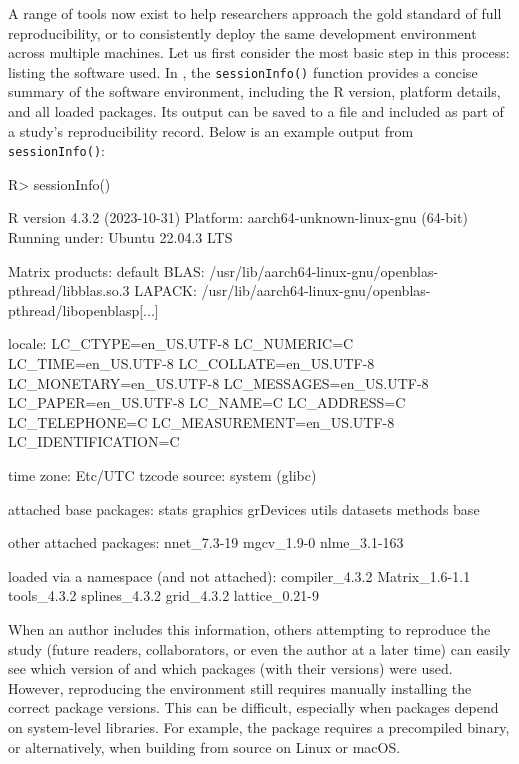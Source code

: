 \documentclass[
  article]{jss}
\begin{document}
A range of tools now exist to help researchers approach the gold
standard of full reproducibility, or to consistently deploy the same
development environment across multiple machines. Let us first consider
the most basic step in this process: listing the software used. In
, the \texttt{sessionInfo()} function provides a concise
summary of the software environment, including the R version, platform
details, and all loaded packages. Its output can be saved to a file and
included as part of a study's reproducibility record. Below is an
example output from \texttt{sessionInfo()}:

\begin{CodeInput}
R> sessionInfo()
\end{CodeInput}
\begin{CodeOutput}
R version 4.3.2 (2023-10-31)
Platform: aarch64-unknown-linux-gnu (64-bit)
Running under: Ubuntu 22.04.3 LTS

Matrix products: default
BLAS:   /usr/lib/aarch64-linux-gnu/openblas-pthread/libblas.so.3
LAPACK: /usr/lib/aarch64-linux-gnu/openblas-pthread/libopenblasp[...]

locale:
 LC_CTYPE=en_US.UTF-8       LC_NUMERIC=C              
 LC_TIME=en_US.UTF-8        LC_COLLATE=en_US.UTF-8    
 LC_MONETARY=en_US.UTF-8    LC_MESSAGES=en_US.UTF-8   
 LC_PAPER=en_US.UTF-8       LC_NAME=C                 
 LC_ADDRESS=C               LC_TELEPHONE=C            
 LC_MEASUREMENT=en_US.UTF-8 LC_IDENTIFICATION=C       

time zone: Etc/UTC
tzcode source: system (glibc)

attached base packages:
 stats     graphics  grDevices utils     datasets  methods   base     

other attached packages:
 nnet_7.3-19  mgcv_1.9-0   nlme_3.1-163

loaded via a namespace (and not attached):
 compiler_4.3.2  Matrix_1.6-1.1  tools_4.3.2     splines_4.3.2
 grid_4.3.2      lattice_0.21-9 
\end{CodeOutput}

When an author includes this information, others attempting to reproduce
the study (future readers, collaborators, or even the author at a later
time) can easily see which version of  and which packages
(with their versions) were used. However, reproducing the environment
still requires manually installing the correct package versions. This
can be difficult, especially when packages depend on system-level
libraries. For example, the  package requires a precompiled
 binary, or alternatively,  when
building from source on Linux or macOS.
\end{document}
